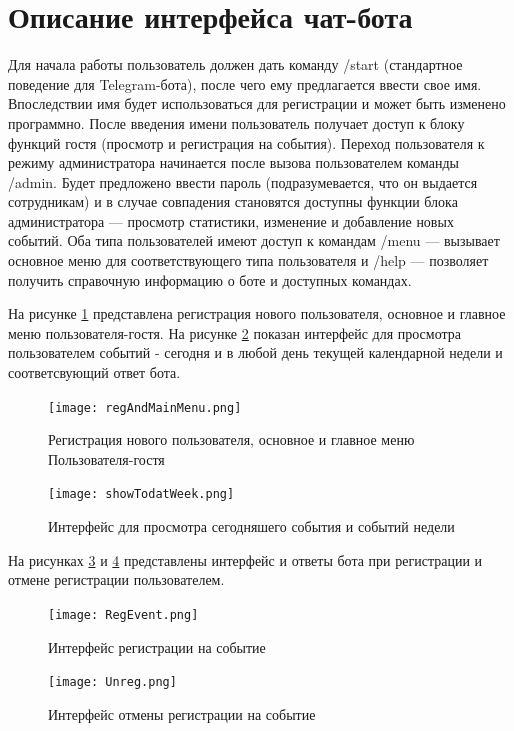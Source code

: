 \documentclass[12pt,a4paper,oneside]{report}
\begin{document}
\section{Описание интерфейса чат-бота}
\quad Для начала работы пользователь должен дать команду /start (стандартное поведение для Telegram-бота), после чего ему предлагается ввести свое имя. Впоследствии имя будет использоваться для регистрации и может быть изменено программно. После введения имени пользователь получает доступ к блоку функций гостя (просмотр и регистрация на события).
 Переход пользователя к режиму администратора начинается после вызова пользователем команды /admin. Будет предложено ввести пароль (подразумевается, что он выдается сотрудникам) и в случае совпадения становятся доступны функции блока администратора — просмотр статистики, изменение и добавление новых событий. 
Оба типа пользователей имеют доступ к командам /menu — вызывает основное меню для соответствующего типа пользователя и /help — позволяет получить справочную информацию о боте и доступных командах. 


На рисунке \ref{ris:reg1}  представлена регистрация нового пользователя, основное и главное меню пользователя-гостя. На рисунке \ref{ris:todayWeek} показан интерфейс для просмотра пользователем событий - сегодня и в любой день текущей календарной недели и соответсвующий ответ бота.

\begin{figure}[h]
	\centering
	\texttt{[image: regAndMainMenu.png]}
	\caption{Регистрация нового пользователя, основное и главное меню Пользователя-гостя}
	\label{ris:reg1}
\end{figure}


\begin{figure}[h]
	\centering
	\texttt{[image: showTodatWeek.png]}
	\caption{Интерфейс для просмотра сегодняшего события и событий недели}
	\label{ris:todayWeek}
\end{figure}



На рисунках \ref{ris:regEvent} и \ref{ris:unregEvent} представлены интерфейс и ответы бота при регистрации и отмене регистрации пользователем. 

\begin{figure}[h]
	\centering
	\texttt{[image: RegEvent.png]}
	\caption{Интерфейс регистрации на событие}
	\label{ris:regEvent}
\end{figure}

\begin{figure}[h]
	\centering
	\texttt{[image: Unreg.png]}
	\caption{Интерфейс отмены регистрации на событие}
	\label{ris:unregEvent}
\end{figure}
\end{document}
